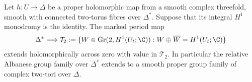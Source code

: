 \begin{proposition}\hypertarget{tag-01GD}{}\label{cdp:st:D.2.6}


Let $h:U\to\Delta$ be a proper holomorphic map from a smooth
complex threefold, smooth with connected two-torus fibres over
$\Delta^*$. Suppose that its integral $H^1$ monodromy is the
identity. The marked period map
\[
 \Delta^*\longrightarrow
 \mathcal T_2
 :=\{W\in\operatorname{Gr}(2,H^1(U_t;\C)):
                   W\oplus\overline W=H^1(U_t;\C)\}
\]
extends holomorphically across zero with value in $\mathcal T_2$.
In particular the relative Albanese group family over $\Delta^*$
extends to a smooth proper group family of complex two-tori over
$\Delta$. 
\end{proposition}



